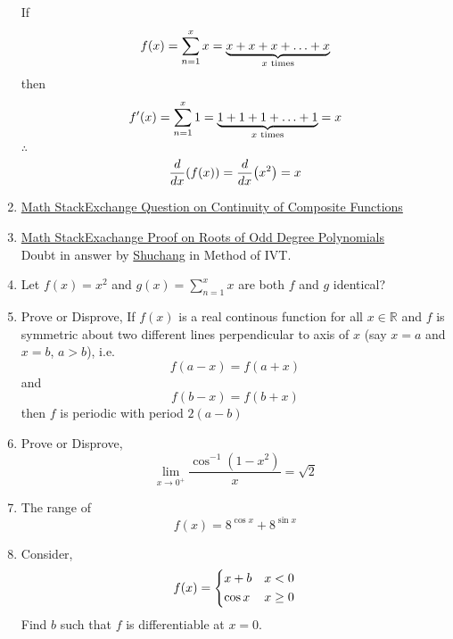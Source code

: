 \documentclass{article}
\begin{document}
\begin{enumerate}
            If $$f(x)=\displaystyle\sum_{n=1}^{x} x=\underbrace{x+x+x+\ldots +x}_{x \hspace{1mm} \text{times}}$$
            then $$f'(x)=\displaystyle\sum_{n=1}^{x} 1=\underbrace{1+1+1+\ldots+1}_{x \hspace{1mm} \text{times}}=x$$
            $\therefore$ $$\dv{x}(f(x))=\dv{x}(x^2)=x$$
      \item \href{https://math.stackexchange.com/questions/4892287/is-this-result-on-continuity-of-composite-functions-true}{Math StackExchange Question on Continuity of Composite Functions}
      \item \href{https://math.stackexchange.com/questions/689575/proof-that-every-polynomial-of-odd-degree-has-one-real-root}{Math StackExachange Proof on Roots of Odd Degree Polynomials } \\ Doubt in answer by  \href{https://math.stackexchange.com/users/91982/shuchang}{Shuchang} in Method of IVT.
      \item Let $f(x)=x^2$ and $g(x)=\displaystyle\sum_{n=1}^{x}x$
            \newline \newline are both $f$ and $g$ identical?
      \item Prove or Disprove,
            If $f(x)$ is a real continous function for all $x \in \mathbb{R}$ and $f$ is symmetric about two different lines perpendicular to axis of $x$ (say $x=a$ and $x=b$, $a>b$), i.e. $$f(a-x)=f(a+x) $$ and $$f(b-x)=f(b+x)$$ then $f$ is periodic with period $2(a-b)$
      \item Prove or Disprove,
            $$\lim\limits_{x \to 0^+}{\dfrac{\cos^{-1} \left(1-x^2\right)}{x}}=\sqrt{2}$$
      \item The range of $$f(x)=8^{\cos x}+8^{\sin x}$$
      \item Consider, $$f(x)=\begin{dcases}
            x+b & x<0 \\
            \cos x & x \ge 0
      \end{dcases}$$
      Find $b$ such that $f$ is differentiable at $x=0$.
\end{enumerate}
\end{document}
